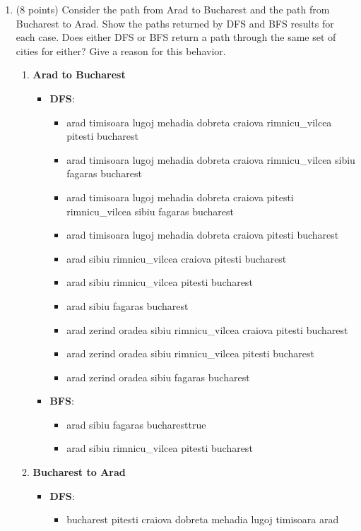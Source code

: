 \documentclass{article}%
\begin{document}
\begin{enumerate}
	\begin{enumerate}
	\item (8 points) Consider the path from Arad to Bucharest and the path from Bucharest to Arad. Show the paths returned by DFS and BFS results for each case.
Does either DFS or BFS return a path through the same set of cities for either? Give a reason for this behavior.
		\begin{enumerate}
		\item \textbf{Arad to Bucharest}
			\begin{itemize}
			\item \textbf{DFS}:
				\begin{itemize}
				\item arad timisoara lugoj mehadia dobreta craiova rimnicu\_vilcea pitesti bucharest
				\item arad timisoara lugoj mehadia dobreta craiova rimnicu\_vilcea sibiu fagaras bucharest 
				\item arad timisoara lugoj mehadia dobreta craiova pitesti rimnicu\_vilcea sibiu fagaras bucharest 
				\item arad timisoara lugoj mehadia dobreta craiova pitesti bucharest 
				\item arad sibiu rimnicu\_vilcea craiova pitesti bucharest 
				\item arad sibiu rimnicu\_vilcea pitesti bucharest 
				\item arad sibiu fagaras bucharest 
				\item arad zerind oradea sibiu rimnicu\_vilcea craiova pitesti bucharest 
				\item arad zerind oradea sibiu rimnicu\_vilcea pitesti bucharest 
				\item arad zerind oradea sibiu fagaras bucharest 
				\end{itemize}
			\item \textbf{BFS}:
				\begin{itemize}
				\item arad sibiu fagaras bucharesttrue 
				\item arad sibiu rimnicu\_vilcea pitesti bucharest
				\end{itemize}
			\end{itemize}
		\item \textbf{Bucharest to Arad}
		\begin{itemize}
			\item \textbf{DFS}:
				\begin{itemize}
				\item bucharest pitesti craiova dobreta mehadia lugoj timisoara arad

\end{itemize}
\end{itemize}
\end{enumerate}
\end{enumerate}
\end{enumerate}
\end{document}
